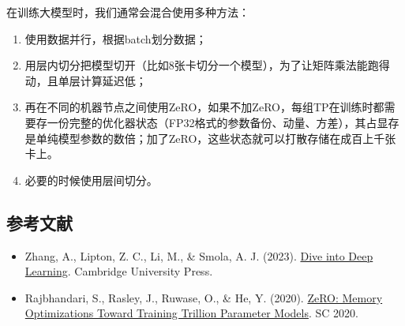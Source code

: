 在训练大模型时，我们通常会混合使用多种方法：

\begin{enumerate}
\def\labelenumi{\arabic{enumi}.}
\item
  使用数据并行，根据batch划分数据；
\item
  用层内切分把模型切开（比如8张卡切分一个模型），为了让矩阵乘法能跑得动，且单层计算延迟低；
\item
  再在不同的机器节点之间使用ZeRO，如果不加ZeRO，每组TP在训练时都需要存一份完整的优化器状态（FP32格式的参数备份、动量、方差），其占显存是单纯模型参数的数倍；加了ZeRO，这些状态就可以打散存储在成百上千张卡上。
\item
  必要的时候使用层间切分。
\end{enumerate}

\FloatBarrier
{}
\hypertarget{ux53c2ux8003ux6587ux732e-36}{%
\subsection{参考文献}\label{ux53c2ux8003ux6587ux732e-36}}

\vspace{0.25em}
\begin{itemize}
\tightlist
\item
  Zhang, A., Lipton, Z. C., Li, M., \& Smola, A. J. (2023). \href{https://D2L.ai}{Dive into Deep Learning}. Cambridge University Press.
\item
  Rajbhandari, S., Rasley, J., Ruwase, O., \& He, Y. (2020). \href{https://arxiv.org/abs/1910.02054}{ZeRO: Memory Optimizations Toward Training Trillion Parameter Models}. SC 2020.
\end{itemize}

\clearpage
